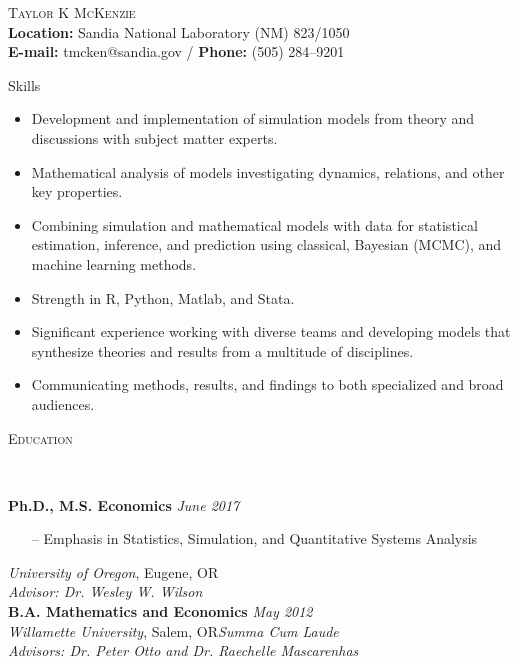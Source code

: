 \documentclass[11pt]{article}
\newenvironment{changemargin}[2]{%
  \begin{list}{}{%
    \setlength{\topsep}{0pt}%
    \setlength{\leftmargin}{#1}%
    \setlength{\rightmargin}{#2}%
    \setlength{\listparindent}{\parindent}%
    \setlength{\itemindent}{\parindent}%
    \setlength{\parsep}{\parskip}%
  }%
  \item[]}{\end{list}
}
\newcommand{\lineover}{
	\begin{changemargin}{-0.05in}{-0.05in}
		\vspace*{-8pt}
		\hrulefill \\
		\vspace*{-2pt}
	\end{changemargin}
}
\newcommand{\header}[1]{
	\begin{changemargin}{-0.5in}{-0.5in}
		\scshape{#1}\\
  	\lineover
	\end{changemargin}
}
\newcommand{\contact}[4]{
	\begin{changemargin}{-0.5in}{-0.5in}
		\begin{center}
			{\Large \scshape {#1}}\\ \smallskip
			{#2}\\ \smallskip 
			{#3}\\ \smallskip
			{#4}\smallskip
		\end{center}
	\end{changemargin}
}
\newenvironment{body} {
	\vspace*{-16pt}
	\begin{changemargin}{-0.25in}{-0.5in}
  }	
	{\end{changemargin}
}
\begin{document}
\vspace*{-1.1in}
\contact{Taylor K McKenzie}{ \textbf{Location:} Sandia National Laboratory (NM) 823/1050}{\textbf{E-mail:} tmcken@sandia.gov / \textbf{Phone:} (505) 284--9201}


\header{Skills}

\begin{body}
	\vspace{14pt}
	\begin{itemize}
		\item Development and implementation of simulation models from theory and discussions with subject matter experts.
		\item Mathematical analysis of models investigating dynamics, relations, and other key properties.
		\item Combining simulation and mathematical models with data for statistical estimation, inference, and prediction using classical, Bayesian (MCMC), and machine learning methods.
		\item Strength in R, Python, Matlab, and Stata.
		\item Significant experience working with diverse teams and developing models that synthesize theories and results from a multitude of disciplines.
		\item Communicating methods, results, and findings to both specialized and broad audiences.
	\end{itemize}
\end{body}

\smallskip

\header{Education}

\begin{body}
	\vspace{14pt}
	\textbf{Ph.D., M.S. Economics}{} \hfill \emph{June 2017}{} \\
	\begin{itemize}
		\vspace*{-1ex}
		\item[--] Emphasis in Statistics, Simulation, and Quantitative Systems Analysis
		\vspace*{-1ex}
	\end{itemize}
	\emph{University of Oregon}, Eugene, OR{}\\
	\emph{Advisor: Dr. Wesley W. Wilson} \\
	\vspace*{0pt}
  \medskip
  	\textbf{B.A. Mathematics and Economics}{} \hfill \emph{May 2012}{} \\
	\emph{Willamette University}, Salem, OR{}\hfill \emph{Summa Cum Laude}{}\\
	\emph{Advisors: Dr. Peter Otto and Dr. Raechelle Mascarenhas} {} \hfill\\
\end{body}
\smallskip
\end{document}
